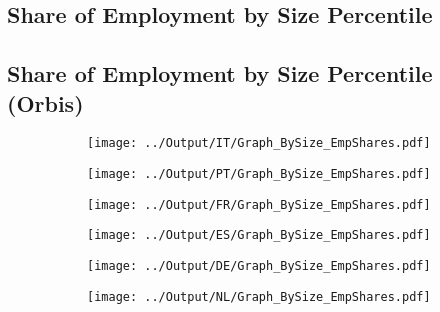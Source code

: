 \documentclass[12pt,notitlepage]{article}
\begin{document}
\subsection{Share of Employment by Size Percentile} %
\label{sec:employment_by_size}

\begin{table}[!htpb]
\end{table}



\subsection{Share of Employment by Size Percentile (Orbis)}
\begin{figure}[!htpb]
\centering
\begin{subfigure}{.49\textwidth}
    \centering
 \texttt{[image: ../Output/IT/Graph\_BySize\_EmpShares.pdf]}
\end{subfigure}%
\begin{subfigure}{.49\textwidth}
    \centering
 \texttt{[image: ../Output/PT/Graph\_BySize\_EmpShares.pdf]}
\end{subfigure}
\begin{subfigure}{.49\textwidth}
    \centering
 \texttt{[image: ../Output/FR/Graph\_BySize\_EmpShares.pdf]}
\end{subfigure}%
\begin{subfigure}{.49\textwidth}
    \centering
 \texttt{[image: ../Output/ES/Graph\_BySize\_EmpShares.pdf]}
\end{subfigure}
\begin{subfigure}{.49\textwidth}
    \centering
 \texttt{[image: ../Output/DE/Graph\_BySize\_EmpShares.pdf]}
\end{subfigure}
\begin{subfigure}{.49\textwidth}
    \centering
 \texttt{[image: ../Output/NL/Graph\_BySize\_EmpShares.pdf]}
\end{subfigure}
\end{figure}
\end{document}
